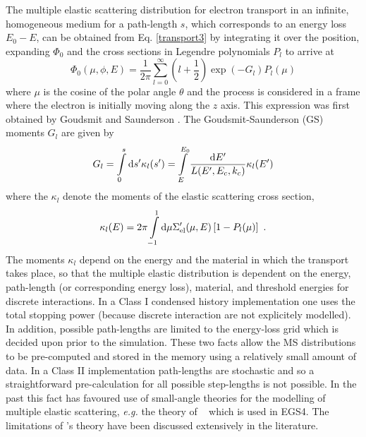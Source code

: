 The multiple elastic scattering distribution for electron 
transport in an infinite, homogeneous medium for a path-length 
$s$, which corresponds to an energy loss $E_0 - E$, can be obtained 
from Eq. \eqref{transport3} by integrating it over the position, 
expanding $\Phi_0$ and the cross sections in Legendre polynomials 
$P_l$ to arrive at
\begin{equation}
\Phi_0(\mu,\phi,E) = \frac{1}{2 \pi} \sum_{l=0}^\infty \left(l + \frac{1}{2} 
\right) \exp( -G_l ) P_l(\mu)
\end{equation}
where $\mu$ is the cosine of the polar angle $\theta$ and the process 
is considered in a frame where the electron is initially moving 
along the $z$ axis. This expression was first obtained by 
Goudsmit and Saunderson \cite{GS40,GS40a}. The Goudsmit-Saunderson 
(GS) moments $G_l$ are given by
\begin{equation}
\label{GS_moments}
G_l = \int\limits_0^s {\rm d}s' \kappa_l(s') =  \int\limits_{E}^{E_0} 
{{\rm d}E' \over L(E',E_c,k_c)} \kappa_l(E') 
\end{equation}
where the $\kappa_l$ denote the moments of the elastic scattering 
cross section,
\begin{equation}
\label{kappa_l}
\kappa_l(E) = 2 \pi 
\int\limits_{-1}^1 {\rm d}\mu 
\Sigma_{\rm el}'(\mu,E) \left[ 1 - P_l(\mu) \right] ~.
\end{equation}
The moments $\kappa_l$ depend on the energy and the material in 
which the transport takes place, so that the 
multiple elastic distribution is dependent on the energy, 
path-length (or corresponding energy loss), material, and 
threshold energies for discrete interactions. In a Class I 
condensed history implementation one uses the total stopping 
power (because discrete interaction are not explicitely modelled). 
In addition, possible path-lengths are limited to the 
energy-loss grid which is decided upon prior to the simulation. 
These two facts allow the MS distributions to be pre-computed 
and stored in the memory using a relatively small amount of 
data. In a Class II implementation path-lengths are stochastic 
and so a straightforward pre-calculation for all possible step-lengths 
is not possible. In the past this fact has favoured use of 
small-angle theories for the modelling of multiple elastic 
scattering, {\em e.g.} the theory of \Mol~ which is used in EGS4. 
The limitations of \Mol's theory have been discussed extensively 
in the literature. 

